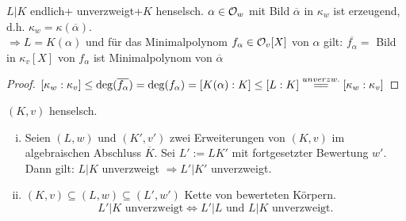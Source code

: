 \begin{Bem}
$L|K$ endlich+ unverzweigt+$K$ henselsch. $\alpha \in \mathcal{O}_w$ mit Bild $\overline{\alpha}$ in $\kappa_w$ ist erzeugend, d.h. $\kappa_w=\kappa(\overline{\alpha})$.\\
$\Rightarrow L=K(\alpha)$ und für das Minimalpolynom $f_\alpha \in \mathcal{O}_v[X]$ von $\alpha$ gilt: $\overline{f_\alpha}=$ Bild in $\kappa_v[X]$ von $f_\alpha$ ist Minimalpolynom von $\overline{\alpha}$
\end{Bem}

\begin{proof}
$[\kappa_w:\kappa_v] \leq \deg(\overline{f_\alpha})=\deg(f_\alpha)=[K(\alpha):K] \leq [L:K]\stackrel{unverzw.}{=\joinrel=}[\kappa_w : \kappa_v]$
\end{proof}

\begin{Prop}
$(K,v)$ henselsch.
\begin{enumerate}[i)]
\item Seien $(L,w)$ und $(K',v')$ zwei Erweiterungen von $(K,v)$ im algebraischen Abschluss $\overline{K}$. Sei $L':=LK'$ mit fortgesetzter Bewertung $w'$. Dann gilt: $L|K$ unverzweigt $\Rightarrow L'|K'$ unverzweigt.
\item $(K,v) \subseteq (L,w) \subseteq (L',w')$ Kette von bewerteten Körpern.
\[L'|K \text{ unverzweigt} \iff L'|L \text{ und } L|K \text{ unverzweigt}.\]
\end{enumerate}
\end{Prop}